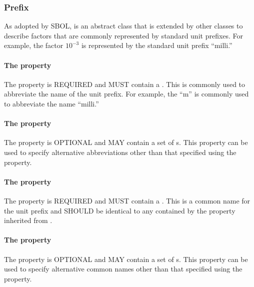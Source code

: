 \subsubsection{Prefix}
\label{sec:Prefix}

As adopted by SBOL,  is an abstract class that is extended by other classes to describe factors that are commonly represented by standard unit prefixes. For example, the factor $10^{-3}$ is represented by the standard unit prefix ``milli.'' 

\paragraph{The  property}\label{sec:symbol:Prefix}
The  property is REQUIRED and MUST contain a . This  is commonly used to abbreviate the name of the unit prefix. For example, the  ``m'' is commonly used to abbreviate the name ``milli.''

\paragraph{The  property}\label{sec:alternativeSymbols:Prefix}
The  property is OPTIONAL and MAY contain a set of s. This property can be used to specify alternative abbreviations other than that specified using the  property.

\paragraph{The  property}\label{sec:label:Prefix}
The  property is REQUIRED and MUST contain a . This  is a common name for the unit prefix and SHOULD be identical to any  contained by the  property inherited from .

\paragraph{The  property}\label{sec:alternativeLabels:Prefix}
The  property is OPTIONAL and MAY contain a set of s. This property can be used to specify alternative common names other than that specified using the  property.

